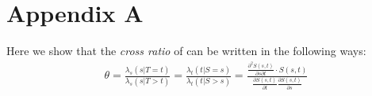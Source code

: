 \documentclass[]{article}
\begin{document}
%
%
%


%



\section*{Appendix A} \label{appendixA}
Here we show that the \emph{cross ratio} of \cite{clayton1978model} can be written in the following ways:
	$$
	\begin{aligned}
	  \theta = \frac{ \lambda_s(s|T=t)}{\lambda_s(s|T>t)} = \frac{ \lambda_t(t|S=s)}{\lambda_t(t|S>s)} = \frac{ \frac{\partial^2 S(s, t)}{\partial s\partial t} \cdot S(s, t)}    {\frac{\partial S(s, t)}{\partial t} \frac{\partial S(s, t)}{\partial s}}
	\end{aligned}
	$$
\end{document}
